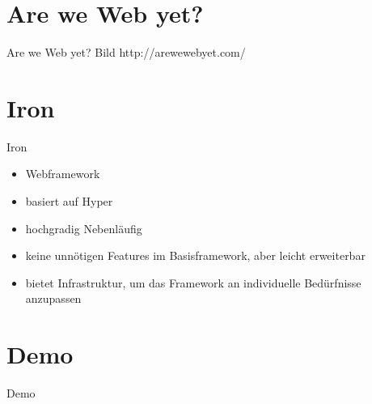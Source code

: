 \documentclass[12pt]{beamer}
\begin{document}
\section{Are we Web yet?}

\begin{frame}{Are we Web yet?}
Bild http://arewewebyet.com/
\end{frame}

\section{Iron}
\begin{frame}{Iron}
\begin{itemize}
    \item Webframework
    \item basiert auf Hyper
    \item hochgradig Nebenläufig
    \item keine unnötigen Features im Basisframework, aber leicht erweiterbar
    \item bietet Infrastruktur, um das Framework an individuelle Bedürfnisse anzupassen
\end{itemize}

\end{frame}


\section{Demo}
\begin{frame}{Demo}

\end{frame}
\end{document}
